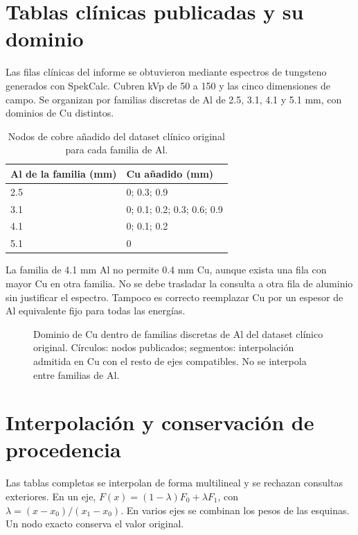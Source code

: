 \section{Tablas clínicas publicadas y su dominio}
Las filas clínicas del informe se obtuvieron mediante espectros de tungsteno generados con SpekCalc. Cubren kVp de 50 a 150 y las cinco dimensiones de campo. Se organizan por familias discretas de Al de \num{2.5}, \num{3.1}, \num{4.1} y \num{5.1} mm, con dominios de Cu distintos.
\begin{table}[htbp]\centering
\caption{Nodos de cobre añadido del dataset clínico original para cada familia de Al.}
\begin{tabular}{ll}\toprule
Al de la familia (mm) & Cu añadido (mm)\\\midrule
\num{2.5} & 0; \num{0.3}; \num{0.9}\\
\num{3.1} & 0; \num{0.1}; \num{0.2}; \num{0.3}; \num{0.6}; \num{0.9}\\
\num{4.1} & 0; \num{0.1}; \num{0.2}\\
\num{5.1} & 0\\\bottomrule
\end{tabular}
\end{table}
La familia de \num{4.1} mm Al no permite \num{0.4} mm Cu, aunque exista una fila con mayor Cu en otra familia. No se debe trasladar la consulta a otra fila de aluminio sin justificar el espectro. Tampoco es correcto reemplazar Cu por un espesor de Al equivalente fijo para todas las energías.



\begin{figure}[htbp]\centering
\caption{Dominio de Cu dentro de familias discretas de Al del dataset clínico original. Círculos: nodos publicados; segmentos: interpolación admitida en Cu con el resto de ejes compatibles. No se interpola entre familias de Al.}\label{fig:dominio}\end{figure}

\section{Interpolación y conservación de procedencia}
Las tablas completas se interpolan de forma multilineal y se rechazan consultas exteriores. En un eje, $F(x)=(1-\lambda)F_0+\lambda F_1$, con $\lambda=(x-x_0)/(x_1-x_0)$. En varios ejes se combinan los pesos de las esquinas. Un nodo exacto conserva el valor original.

